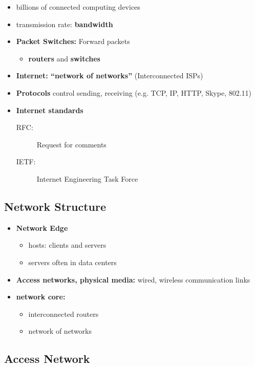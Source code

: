\begin{itemize}
	\item billions of connected computing devices
	\item transmission rate: \textbf{bandwidth}
	\item \textbf{Packet Switches:} Forward packets
	\begin{itemize}
		\item \textbf{routers} and \textbf{switches}
	\end{itemize}
	\item \textbf{Internet: ``network of networks''} (Interconnected ISPs)
	\item \textbf{Protocols} control sending, receiving (e.g. TCP, IP, HTTP, Skype, 802.11)
	\item \textbf{Internet standards}
	\begin{description}
		\item[RFC:] Request for comments
		\item[IETF:] Internet Engineering Task Force
	\end{description}
\end{itemize}

\subsection{Network Structure}
\begin{itemize}
	\item \textbf{Network Edge}
	\begin{itemize}
		\item hosts: clients and servers
		\item servers often in data centers
	\end{itemize}
	\item \textbf{Access networks, physical media:} wired, wireless communication links
	\item \textbf{network core:}
	\begin{itemize}
		\item interconnected routers
		\item network of networks
	\end{itemize}
\end{itemize}

\subsection{Access Network}
